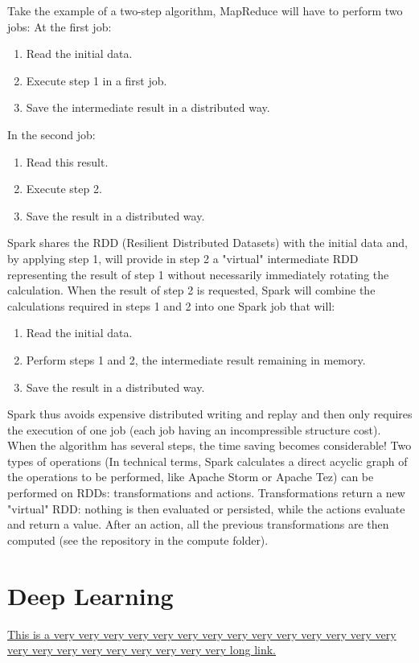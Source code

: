 \documentclass{acmtog} %
\begin{document}
Take the example of a two-step algorithm, MapReduce will have to perform two jobs:
At the first job:
\begin{enumerate}
\item	Read the initial data.
\item	Execute step 1 in a first job.
\item	Save the intermediate result in a distributed way.
\end{enumerate}
In the second job:
\begin{enumerate}
\item	Read this result.
\item	Execute step 2.
\item	Save the result in a distributed way.
\end{enumerate}
Spark shares the RDD (Resilient Distributed Datasets) with the initial data and, by applying step 1, will provide in step 2 a "virtual" intermediate RDD representing the result of step 1 without necessarily immediately rotating the calculation. When the result of step 2 is requested, Spark will combine the calculations required in steps 1 and 2 into one Spark job that will:
\begin{enumerate}
\item	Read the initial data.
\item	Perform steps 1 and 2, the intermediate result remaining in memory.
\item	Save the result in a distributed way.
\end{enumerate}
Spark thus avoids expensive distributed writing and replay and then only requires the execution of one job (each job having an incompressible structure cost).
When the algorithm has several steps, the time saving becomes considerable!
Two types of operations (In technical terms, Spark calculates a direct acyclic graph of the operations to be performed, like Apache Storm or Apache Tez) can be performed on RDDs: transformations and actions. Transformations return a new "virtual" RDD: nothing is then evaluated or persisted, while the actions evaluate and return a value. After an action, all the previous transformations are then computed (see the repository in the compute folder).

\section{Deep Learning}
\label{sec:dp}
\href{http://tex.stackexchange.com}{This is a very very
  very very very very very very very very very very very very very
  very very very very very very very very long link.}
\end{document}
